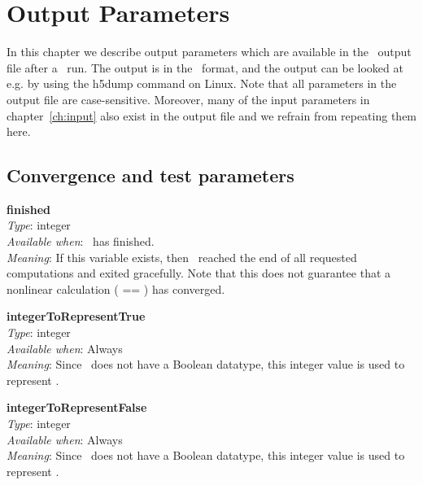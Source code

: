 \chapter{Output Parameters}
\label{ch:output}

\newcommand{\outputparam}[4]{{\setlength{\parindent}{0cm} {\ttfamily \bfseries \hypertarget{#1}{#1}}\\{\it Type}: #2\\{\it Available when}: #3\\{\it Meaning}: #4}}
\newcommand{\outputparamWithUnderscore}[5]{{\setlength{\parindent}{0cm} {\ttfamily \bfseries \hypertarget{#2}{#1}}\\{\it Type}: #3\\{\it Available when}: #4\\{\it Meaning}: #5}}
\newcommand{\underscoreparlink}[2]{{\ttfamily \hyperlink{#2}{#1}}}

In this chapter we describe output parameters which are available in the \sfincs~output file  after a %
\sfincs~run. 
The output is in the \HDF~format, and the output can be looked at e.g. by using the {\ttfamily h5dump} command on Linux. 
Note that all parameters in the output file are case-sensitive. 
Moreover, many of the input parameters in chapter~\ref{ch:input} also exist in the output file and we refrain from repeating them here. 


\section{Convergence and test parameters}

\myhrule

\outputparam{finished}
{integer}
{\sfincs~has finished.}
{If this variable exists, then \sfincs~reached the end of all requested computations and exited gracefully. 
Note that this does not guarantee that a nonlinear calculation (\parlink{includePhi1} == \true) has converged.}

\myhrule

\outputparam{integerToRepresentTrue}
{integer}
{Always}
{Since \HDF~does not have a Boolean datatype, this integer value is used to represent \true.}

\myhrule

\outputparam{integerToRepresentFalse}
{integer}
{Always}
{Since \HDF~does not have a Boolean datatype, this integer value is used to represent \false.}

\myhrule

